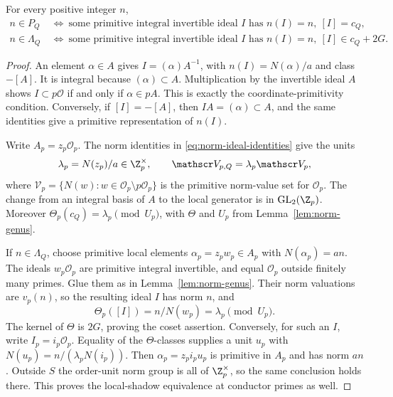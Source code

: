 \begin{lemma}\label{lem:form-ideal-shadow}
For every positive integer \(n\),
\begin{align*}
 n\in P_Q
 &\ \Longleftrightarrow\
 \text{some primitive integral invertible ideal }I
       \text{ has }n(I)=n,\ [I]=c_Q,\\
 n\in\Lambda_Q
 &\ \Longleftrightarrow\
 \text{some primitive integral invertible ideal }I
       \text{ has }n(I)=n,\ [I]\in c_Q+2G.
\end{align*}
\end{lemma}
\begin{proof}
An element \(\alpha\in A\) gives \(I=(\alpha)A^{-1}\), with
\(n(I)=N(\alpha)/a\) and class \(-[A]\). It is integral because
\((\alpha)\subset A\). Multiplication by the invertible ideal \(A\)
shows \(I\subset p\mathcal O\) if and only if \(\alpha\in pA\).
This is exactly the coordinate-primitivity condition. Conversely,
if \([I]=-[A]\), then \(IA=(\alpha)\subset A\), and the same
identities give a primitive representation of \(n(I)\).

Write \(A_p=z_p\mathcal O_p\). The norm identities in
\eqref{eq:norm-ideal-identities} give the units
\[
 \lambda_p=N(z_p)/a\in\Z_p^\times,\qquad
 \mathscr V_{p,Q}=\lambda_p\mathscr V_p,
\]
where
\(\mathscr V_p=\{N(w):w\in\mathcal O_p\setminus p\mathcal O_p\}\)
is the primitive norm-value set for \(\mathcal O_p\). The change from
an integral basis of \(A\) to the local generator is in \(\operatorname{GL}_2(\Z_p)\).
Moreover \(\Theta_p(c_Q)=\lambda_p\pmod{U_p}\), with \(\Theta\)
and \(U_p\) from Lemma~\ref{lem:norm-genus}.

If \(n\in\Lambda_Q\), choose primitive local elements
\(\alpha_p=z_pw_p\in A_p\) with \(N(\alpha_p)=an\).
The ideals \(w_p\mathcal O_p\) are primitive integral invertible,
and equal \(\mathcal O_p\) outside finitely many primes. Glue them
as in Lemma~\ref{lem:norm-genus}. Their norm valuations are
\(v_p(n)\), so the resulting ideal \(I\) has norm \(n\), and
\[
 \Theta_p([I])=n/N(w_p)=\lambda_p\pmod{U_p}.
\]
The kernel of \(\Theta\) is \(2G\), proving the coset assertion.
Conversely, for such an \(I\), write \(I_p=i_p\mathcal O_p\).
Equality of the \(\Theta\)-classes supplies a unit \(u_p\) with
\(N(u_p)=n/(\lambda_pN(i_p))\). Then
\(\alpha_p=z_pi_pu_p\) is primitive in \(A_p\) and has norm
\(an\). Outside \(S\) the order-unit norm group is all of
\(\Z_p^\times\), so the same conclusion holds there.
This proves the local-shadow equivalence at conductor primes as well.
\end{proof}

